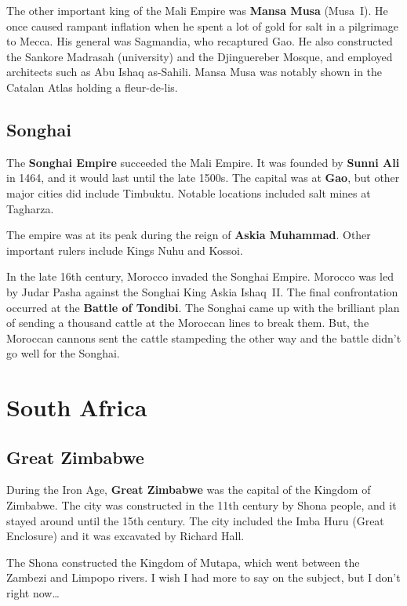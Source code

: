The other important king of the Mali Empire was \textbf{Mansa Musa} (Musa~I).
He once caused rampant inflation when he spent a lot of gold for salt in a pilgrimage to Mecca.
His general was Sagmandia, who recaptured Gao.
He also constructed the Sankore Madrasah (university) and the Djinguereber Mosque,
and employed architects such as Abu Ishaq as-Sahili.
Mansa Musa was notably shown in the Catalan Atlas holding a fleur-de-lis.

\subsection*{Songhai}

The \textbf{Songhai Empire} succeeded the Mali Empire.
It was founded by \textbf{Sunni Ali} in 1464, and it would last until the late 1500s.
The capital was at \textbf{Gao}, but other major cities did include Timbuktu.
Notable locations included salt mines at Tagharza.

The empire was at its peak during the reign of \textbf{Askia Muhammad}.
Other important rulers include Kings Nuhu and Kossoi.

In the late 16th century, Morocco invaded the Songhai Empire.
Morocco was led by Judar Pasha against the Songhai King Askia Ishaq~II\@.
The final confrontation occurred at the \textbf{Battle of Tondibi}.
The Songhai came up with the brilliant plan of sending a thousand cattle at the Moroccan lines to break them.
But, the Moroccan cannons sent the cattle stampeding the other way and the battle didn't go well for the Songhai.

\section{South Africa}

\subsection*{Great Zimbabwe}

During the Iron Age, \textbf{Great Zimbabwe} was the capital of the Kingdom of Zimbabwe.
The city was constructed in the 11th century by Shona people, and it stayed around until the 15th century.
The city included the Imba Huru (Great Enclosure) and it was excavated by Richard Hall.

The Shona constructed the Kingdom of Mutapa, which went between the Zambezi and Limpopo rivers.
I wish I had more to say on the subject, but I don't right now\ldots{}
